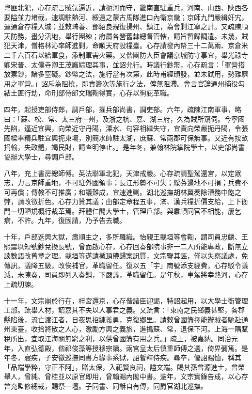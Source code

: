 \begin{pinyinscope}
粵匪北犯，心存疏言賊氛逼近，請扼河而守，畿南直駐重兵，河南、山西、陜西各要隘並力堵截，速調駐熱河、綏遠之蒙古馬隊進口內衛京畿；京師九門嚴緝奸宄，運通倉存糧入城；並敕琦善、鄧紹良規復揚州、鎮江，為會剿江寧之計。又疏陳順天防務，畫分汛地，舉行團練；府屬各營舊隸總督管轄，請旨暫歸調遣。未幾，賊犯天津，僧格林沁率師進剿，命順天府設糧臺。心存請發內帑三十二萬兩、京倉米二千六百石以給軍食，添制軍需火藥。又偕團防大臣會議京城防守事宜，舉光祿寺卿宋晉、太僕寺卿王茂廕綜理其事，並詔允行。時議行鈔幣，心存疏言：「軍營搭放票鈔，諸多窒礙。鈔幣之法，施行當有次第，此時甫經頒發，並未試用，勢難驟用之軍營。」詔斥為阻撓，即責籌次等施行之法，俾無阻滯。會言官論通州捕役勾結土匪行劫，命刑部侍郎文瑞鞫得實，心存以徇庇革職。

四年，起授吏部侍郎，調戶部，擢兵部尚書，調吏部。六年，疏陳江南軍事，略曰：「蘇、松、常、太三府一州，及浙之杭、嘉、湖三府，久為賊所窺伺。今寧國先陷，逼近宜興，向榮近守丹陽，溧水、句容相繼失守，宜責向榮嚴扼丹陽，令張國樑率精兵駐宜興扼東壩，別簡水師駐太湖，庶蘇、常兩郡可保無事。又近有按畝捐輸，失政體，竭民財，請查明停止。」是年冬，兼翰林院掌院學士，以吏部尚書協辦大學士，尋調戶部。

八年，充上書房總師傅。英法聯軍北犯，天津戒嚴。心存疏請聖駕還宮，以定眾志，力言京師重地，不可駐外國領事；長江形勢不可失；綏芬邊地不可捐；兵費不可再償；傳教不可推廣；和議難成，宜速進剿。湖北巡撫胡林翼奏除漕務中飽之弊，請改徵折色。心存力贊其議；由部定章程五事，滿、漢兵糧折價支給，上下衙門一切陋規概行裁革焉。拜體仁閣大學士，管理戶部。與肅順同官不相能，屢乞病，不許。九年，復固請，乃予告去職。

十年，戶部迭興大獄，肅順主之，多所羅織。怡親王載垣等會鞫，謂司員忠麟、王熙震以短號鈔兌換長號，曾面啟心存，心存回奏部院事非一二人所能專政，斷無立談數語改舊章之理。載垣等遂請褫頂帶歸案訊質，文宗鑒其誣，僅以失察議處，免傳訊，議降五級，改俟補官，革職留任。復以五「宇」商號添支經費，心存駁令議減，未陳奏，司員即列入奏銷，下嚴議，革職留任。是年秋，車駕將幸熱河，心存上疏切諫。

十一年，文宗崩於行在，梓宮還京，心存偕諸臣迎謁，特詔起用，以大學士銜管理工部。疏舉人材，詔嘉其不失以人事君之義。又疏言：「東南之民鄉義甚堅，各郡縣陷後，流亡渡江者，日夜思招練義勇，克復鄉里。請敕曾國籓擇能辦賊者馳赴通州東臺，收拾將散之人心，激勵方興之義旅，進搗蘇、常，退保下河。上海一隅賦稅所出，宜取江海關無窮之利，以供曾國籓有用之兵。」疏上，被嘉納。同治元年，入直弘德殿，偕祁俊藻等授穆宗讀。兩宮皇太后慎重師傅之選，倚畀彌篤。是年冬，寢疾，子安徽巡撫同書方緣事系獄，詔暫釋侍疾。尋卒，優詔賜恤，稱其「品端學粹，守正不阿」，贈太保，入祀賢良祠，謚文端。賜其孫曾源進士，曾榮舉人，曾純、曾桂並以原官即用，曾翰賜內閣中書。逾年，文宗實錄告成，以心存曾充監修總裁，賜祭一壇。子同書、同龢自有傳，同爵官湖北巡撫。


\end{pinyinscope}
